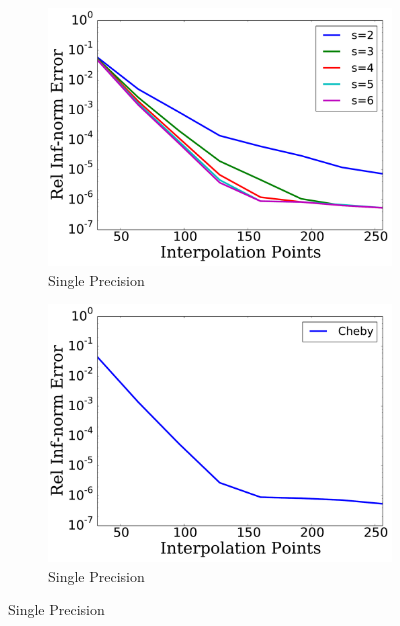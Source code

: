 
\begin{figure}[p]
    \centering
    \begin{subfigure}{0.45\textwidth}
    \includegraphics[width=\textwidth]{plots/msn_2n_fast_smooth_R_100_single.pdf}
    \caption{Single Precision}
    \end{subfigure}
    \begin{subfigure}{0.45\textwidth}
    \includegraphics[width=\textwidth]{plots/cheby_interp_smooth_R_100_single.pdf}
    \caption{Single Precision}
    \end{subfigure}


\end{figure}
